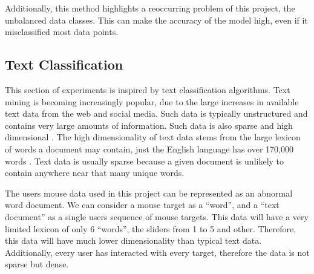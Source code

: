 \documentclass{article}
\begin{document}
Additionally, this method highlights a reoccurring problem of this project, the unbalanced data classes.
This can make the accuracy of the model high, even if it misclassified most data points.




\subsection{Text Classification}


This section of experiments is inspired by text classification algorithms.
Text mining is becoming increasingly popular, due to the large increases in available text data from the web and social media.
Such data is typically unstructured and contains very large amounts of information.
Such data is also sparse and high dimensional \cite{aggarwal2012introduction}.
The high dimensionality of text data stems from the large lexicon of words a document may contain, just the English language has over 170,000 words \cite{BBC2018How}.
Text data is usually sparse because a given document is unlikely to contain anywhere near that many unique words.

The users mouse data used in this project can be represented as an abnormal word document.
We can consider a mouse target as a ``word'', and a ``text document'' as a single users sequence of mouse targets.
This data will have a very limited lexicon of only 6 ``words'', the sliders from 1 to 5 and other.
Therefore, this data will have much lower dimensionality than typical text data.
Additionally, every user has interacted with every target, therefore the data is not sparse but dense.
\end{document}
